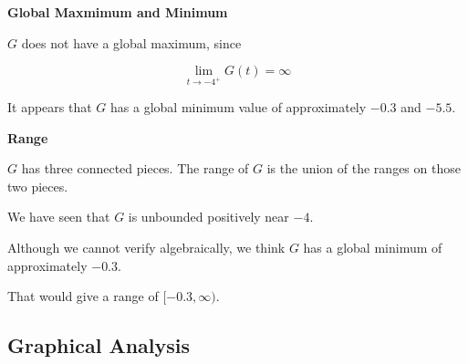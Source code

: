 \documentclass{ximera}
\begin{document}
\textbf{\textcolor{purple!85!blue}{Global Maxmimum and Minimum}} 

\begin{explanation}


$G$ does not have a global maximum, since 


\[
\lim\limits_{t \to -4^+} G(t) = \infty
\]



It appears that $G$ has a global minimum value of approximately $-0.3$ and $-5.5$.



\end{explanation}














\textbf{\textcolor{purple!85!blue}{Range}} 

\begin{explanation}

$G$ has three connected pieces.  The range of $G$ is the union of the ranges on those two pieces. 



We have seen that $G$ is unbounded positively near $-4$.  

Although we cannot verify algebraically, we think $G$ has a global minimum of approximately $-0.3$.


That would give a range of $[-0.3, \infty)$.



\end{explanation}















\subsection*{Graphical Analysis}
\end{document}
